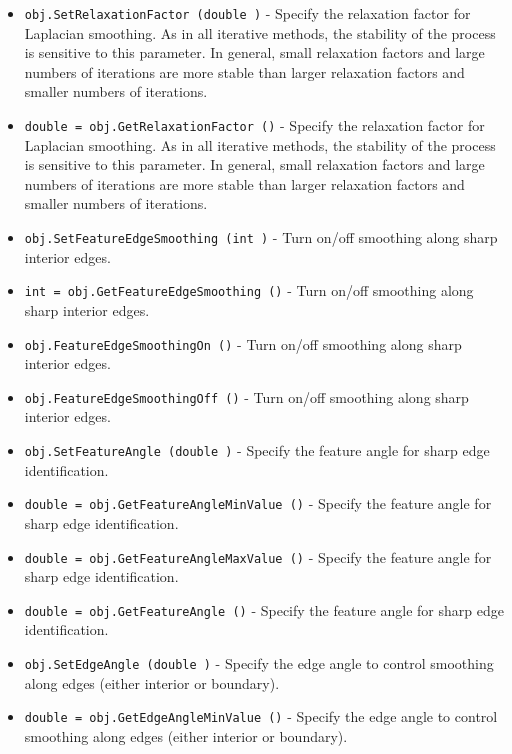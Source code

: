 \begin{itemize}
\item  \verb|obj.SetRelaxationFactor (double )| -  Specify the relaxation factor for Laplacian smoothing. As in all
 iterative methods, the stability of the process is sensitive to
 this parameter. In general, small relaxation factors and large
 numbers of iterations are more stable than larger relaxation
 factors and smaller numbers of iterations.

\item  \verb|double = obj.GetRelaxationFactor ()| -  Specify the relaxation factor for Laplacian smoothing. As in all
 iterative methods, the stability of the process is sensitive to
 this parameter. In general, small relaxation factors and large
 numbers of iterations are more stable than larger relaxation
 factors and smaller numbers of iterations.

\item  \verb|obj.SetFeatureEdgeSmoothing (int )| -  Turn on/off smoothing along sharp interior edges.

\item  \verb|int = obj.GetFeatureEdgeSmoothing ()| -  Turn on/off smoothing along sharp interior edges.

\item  \verb|obj.FeatureEdgeSmoothingOn ()| -  Turn on/off smoothing along sharp interior edges.

\item  \verb|obj.FeatureEdgeSmoothingOff ()| -  Turn on/off smoothing along sharp interior edges.

\item  \verb|obj.SetFeatureAngle (double )| -  Specify the feature angle for sharp edge identification.

\item  \verb|double = obj.GetFeatureAngleMinValue ()| -  Specify the feature angle for sharp edge identification.

\item  \verb|double = obj.GetFeatureAngleMaxValue ()| -  Specify the feature angle for sharp edge identification.

\item  \verb|double = obj.GetFeatureAngle ()| -  Specify the feature angle for sharp edge identification.

\item  \verb|obj.SetEdgeAngle (double )| -  Specify the edge angle to control smoothing along edges (either interior
 or boundary).

\item  \verb|double = obj.GetEdgeAngleMinValue ()| -  Specify the edge angle to control smoothing along edges (either interior
 or boundary).


\end{itemize}
